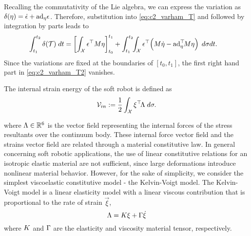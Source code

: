 \noindent Recalling the commutativity of the Lie algebra, we can express the variation as $\delta({\eta}) = \dot{{\epsilon}} + \text{ad}_{{\eta}} {\epsilon}$. Therefore, substitution into \eqref{eq:c2_varham_T} and followed by integration by parts leads to 
\begin{align}
\int_{t_1}^{t_2} \delta(\mathcal{T}) \; dt& = 
\left[ \int_\mathcal{X} {\epsilon}^\top {M} {\eta} \right]_{t_0}^{t_1} +  \int_{t_1}^{t_2} \!\! \int_\mathcal{X}  {\epsilon}^\top \! \left( M\dot{{\eta}} - \text{ad}_{{\eta}}^\top \! M {\eta}\right)\; d\sigma dt\label{eq:c2_varham_T2}.
\end{align}
Since the variations are fixed at the boundaries of $[t_0,t_1]$, the first right hand part in \eqref{eq:c2_varham_T2} vanishes. 

The internal strain energy of the soft robot is defined as{}
\begin{equation}
\mathcal{V}_{in} := \frac{1}{2}\int_\mathcal{X} {\xi}^\top\! {\Lambda} \;d\sigma.
\end{equation}

where ${\Lambda} \in \mathbb{R}^6$ is the vector field representing the internal forces of the stress resultants over the continuum body. These internal force vector field and the strains vector field are related through a material constitutive law. In general concerning soft robotic applications, the use of linear constitutive relations for an isotropic elastic material are not sufficient, since large deformations introduce nonlinear material behavior. However, for the sake of simplicity, we consider the simplest viscoelastic constitutive model - the Kelvin-Voigt model. The Kelvin-Voigt model is a linear elasticity model with a linear viscous contribution that is proportional to the rate of strain $\vec{\xi}$, 
\begin{equation}
{\Lambda} = {K}{\xi} + {\Gamma} \dot{{\xi}}
\end{equation}
where ${K}$ and ${\Gamma}$ are the elasticity and viscosity material tensor, respectively.
